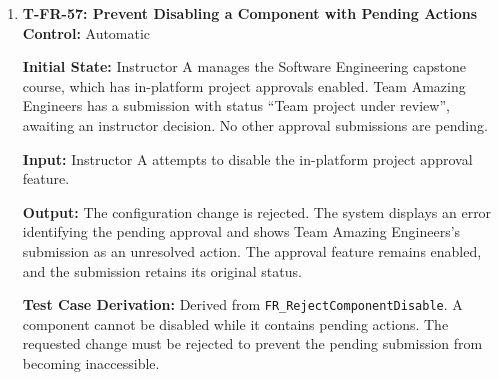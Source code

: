 \documentclass[12pt, titlepage]{article}
\begin{document}
\begin{enumerate}
\textbf{Output:} The instructor's configuration is saved and applied to the Software Engineering capstone course. The first submission is rejected with a validation message identifying the missing GitHub repository link, and the team-project status remains ``Agreed''. The second submission is accepted despite the optional notes being empty, and the team-project status changes to ``Team project submitted''.

\textbf{Test Case Derivation:} Derived from \texttt{FR\_DisableFeatures}, \texttt{FR\_RequestApproval}, and \texttt{FR\_ApprovalPreflightValidate}. The test verifies that the platform enforces instructor-configured, course-specific submission requirements before permitting a team-project to enter the approval workflow.

\textbf{How Test Will Be Performed:} Using Playwright, authenticate as the instructor and configure the required approval submission fields. Save the configuration and authenticate as a member of Team Amazing Engineers. Complete the project description and team information but omit the required GitHub link. Attempt submission and verify that validation prevents the status transition. Enter a valid GitHub link, leave the optional notes empty, and resubmit. Verify that the submission succeeds and the team-project status becomes ``Team project submitted''.

\item \label{T-FR-57}\textbf{T-FR-57: Prevent Disabling a Component with Pending Actions}\\

\textbf{Control:} Automatic

\textbf{Initial State:} Instructor A manages the Software Engineering capstone course, which has in-platform project approvals enabled. Team Amazing Engineers has a submission with status ``Team project under review'', awaiting an instructor decision. No other approval submissions are pending.

\textbf{Input:} Instructor A attempts to disable the in-platform project approval feature.

\textbf{Output:} The configuration change is rejected. The system displays an error identifying the pending approval and shows Team Amazing Engineers's submission as an unresolved action. The approval feature remains enabled, and the submission retains its original status.

\textbf{Test Case Derivation:} Derived from \texttt{FR\_RejectComponentDisable}. A component cannot be disabled while it contains pending actions. The requested change must be rejected to prevent the pending submission from becoming inaccessible.


\end{enumerate}
\end{document}
